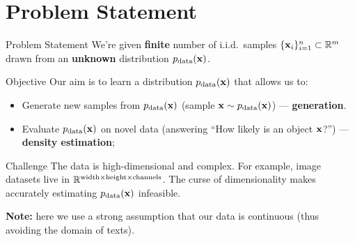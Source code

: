 \documentclass{beamer}
\begin{document}
\section{Problem Statement}
\begin{frame}{Problem Statement}
	We're given \textbf{finite} number of i.i.d.\ samples $\{\mathbf{x}_i\}_{i=1}^n \subset \mathbb{R}^m$ drawn from an \textbf{unknown} distribution $p_{\text{data}}(\mathbf{x})$.
	\eqpause
	\begin{block}{Objective}
		Our aim is to learn a distribution $p_{\text{data}}(\mathbf{x})$ that allows us to: 
		\begin{itemize}
		    \item Generate new samples from $p_{\text{data}}(\mathbf{x})$ (sample $\mathbf{x} \sim p_{\text{data}}(\mathbf{x})$) --- \textbf{generation}.		    
			\eqpause
		    \item Evaluate $p_{\text{data}}(\mathbf{x})$ on novel data (answering ``How likely is an object $\mathbf{x}$?'') --- \textbf{density estimation}; 
		\end{itemize}
	\end{block}
	\eqpause
	\begin{block}{Challenge}
		The data is high-dimensional and complex. For example, image datasets live in $\mathbb{R}^{\text{width} \times \text{height} \times \text{channels}}$. The curse of dimensionality makes accurately estimating $p_{\text{data}}(\mathbf{x})$ infeasible.
	\end{block}
	\eqpause
	\textbf{Note:} here we use a strong assumption that our data is continuous (thus avoiding the domain of texts).
\end{frame}
\end{document}
